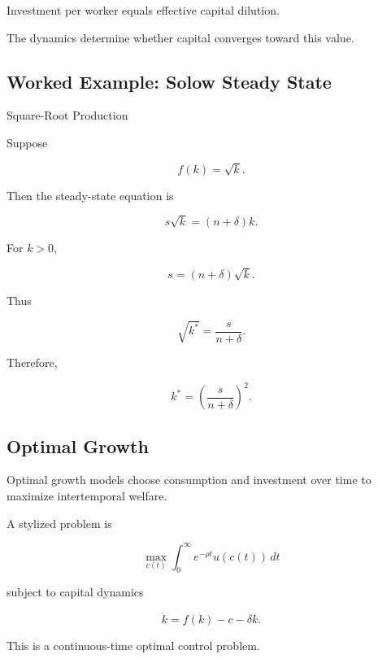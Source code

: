 Investment per worker equals effective capital dilution.

The dynamics determine whether capital converges toward this value.

\subsection{Worked Example: Solow Steady State}
\label{subsec:worked-solow}

\begin{workedexamplebox}{Square-Root Production}

Suppose

\[
f(k)=\sqrt{k}.
\]

Then the steady-state equation is

\[
s\sqrt{k}
=
(n+\delta)k.
\]

For \(k>0\),

\[
s
=
(n+\delta)\sqrt{k}.
\]

Thus

\[
\sqrt{k^*}
=
\frac{s}{n+\delta}.
\]

Therefore,

\begin{answerbox}
\[
\boxed{
k^*
=
\left(
\frac{s}{n+\delta}
\right)^2.
}
\]
\end{answerbox}

\end{workedexamplebox}

\subsection{Optimal Growth}
\label{subsec:optimal-growth}

Optimal growth models choose consumption and investment over time to maximize
intertemporal welfare.

A stylized problem is

\[
\boxed{
\max_{c(t)}
\int_0^\infty
e^{-\rho t}
u(c(t))
\,dt
}
\]

subject to capital dynamics

\[
\boxed{
\dot{k}
=
f(k)-c-\delta k.
}
\]

This is a continuous-time optimal control problem.


